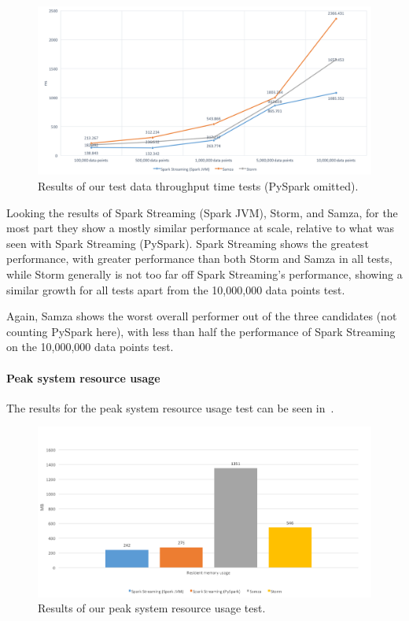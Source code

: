 \begin{figure}[H]
  \centering
  \includegraphics[width=1\textwidth]{includes/figures/fig_throughput_nopyspark_res}
  \caption{Results of our test data throughput time tests (PySpark omitted).}
  \label{fig:throughput_time_res_nopyspark}
\end{figure}

Looking the results of Spark Streaming (Spark JVM), Storm, and Samza, for the most part they show a mostly similar performance
at scale, relative to what was seen with Spark Streaming (PySpark). Spark Streaming shows the greatest performance, with
greater performance than both Storm and Samza in all tests, while Storm generally is not too far off Spark Streaming's
performance, showing a similar growth for all tests apart from the 10,\@000,\@000 data points test.

Again, Samza shows the worst overall performer out of the three candidates (not counting PySpark here), with less than
half the performance of Spark Streaming on the 10,\@000,\@000 data points test.

\paragraph{Peak system resource usage}

The results for the peak system resource usage test can be seen in~.

\begin{figure}[H]
  \centering
  \includegraphics[width=1\textwidth]{includes/figures/fig_peak_resource_res}
  \caption{Results of our peak system resource usage test.}
  \label{fig:resource_usage_res}
\end{figure}

